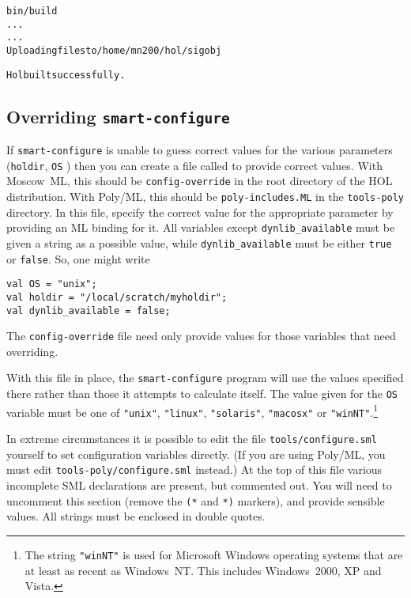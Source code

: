 {\begin{session}
\begin{alltt}
\dol bin/build
  ...
  ...
Uploading files to /home/mn200/hol/sigobj

Hol built successfully.
\dol
\end{alltt}
\end{session}


\subsection{Overriding \texttt{smart-configure}}
\label{sec:editting-configure}

If \texttt{smart-configure} is unable to guess correct values for the
various parameters (\texttt{holdir}, \texttt{OS} \etc) then you can
create a file called to provide correct values.  With Moscow~ML, this
should be \texttt{config-override} in the root directory of the HOL
distribution.  With Poly/ML, this should be \texttt{poly-includes.ML}
in the \texttt{tools-poly} directory. In this file, specify the
correct value for the appropriate parameter by providing an ML binding
for it.  All variables except \texttt{dynlib\_available} must be given
a string as a possible value, while \texttt{dynlib\_available} must be
either \texttt{true} or \texttt{false}.  So, one might write

\begin{session}
\begin{verbatim}
val OS = "unix";
val holdir = "/local/scratch/myholdir";
val dynlib_available = false;
\end{verbatim}
\end{session}

The \texttt{config-override} file need only provide values for those
variables that need overriding.

With this file in place, the \texttt{smart-configure} program will use
the values specified there rather than those it attempts to calculate
itself.  The value given for the \texttt{OS} variable must be one of
\texttt{"unix"}, \texttt{"linux"}, \texttt{"solaris"},
\texttt{"macosx"} or \texttt{"winNT"}.\footnote{The string
  \texttt{"winNT"} is used for Microsoft Windows operating systems
  that are at least as recent as Windows~NT.  This includes
  Windows~2000, XP and Vista.}

In extreme circumstances it is possible to edit the file
\texttt{tools/configure.sml} yourself to set configuration variables
directly.  (If you are using Poly/ML, you must edit
\texttt{tools-poly/configure.sml} instead.) At the top of this file
various incomplete SML declarations are present, but commented out.
You will need to uncomment this section (remove the \texttt{(*} and
\texttt{*)} markers), and provide sensible values.  All strings must
be enclosed in double quotes.

}
